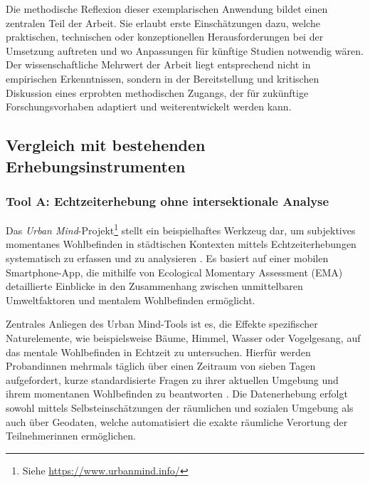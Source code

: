 Die methodische Reflexion dieser exemplarischen Anwendung bildet einen zentralen Teil der Arbeit. Sie erlaubt erste Einschätzungen dazu, welche praktischen, technischen oder konzeptionellen Herausforderungen bei der Umsetzung auftreten und wo Anpassungen für künftige Studien notwendig wären. Der wissenschaftliche Mehrwert der Arbeit liegt entsprechend nicht in empirischen Erkenntnissen, sondern in der Bereitstellung und kritischen Diskussion eines erprobten methodischen Zugangs, der für zukünftige Forschungsvorhaben adaptiert und weiterentwickelt werden kann.


\subsection{Vergleich mit bestehenden Erhebungsinstrumenten}

\subsubsection{Tool A: Echtzeiterhebung ohne intersektionale Analyse}

Das \textit{Urban Mind}-Projekt\footnote{Siehe \url{https://www.urbanmind.info/}} stellt ein beispielhaftes Werkzeug dar, um subjektives momentanes Wohlbefinden in städtischen Kontexten mittels Echtzeiterhebungen systematisch zu erfassen und zu analysieren \parencite{bakolisUrbanMindUsing2018}. Es basiert auf einer mobilen Smartphone-App, die mithilfe von Ecological Momentary Assessment (EMA) detaillierte Einblicke in den Zusammenhang zwischen unmittelbaren Umweltfaktoren und mentalem Wohlbefinden ermöglicht.

Zentrales Anliegen des Urban Mind-Tools ist es, die Effekte spezifischer Naturelemente, wie beispielsweise Bäume, Himmel, Wasser oder Vogelgesang, auf das mentale Wohlbefinden in Echtzeit zu untersuchen. Hierfür werden Proband\:innen mehrmals täglich über einen Zeitraum von sieben Tagen aufgefordert, kurze standardisierte Fragen zu ihrer aktuellen Umgebung und ihrem momentanen Wohlbefinden zu beantworten \parencite{bakolisUrbanMindUsing2018}. Die Datenerhebung erfolgt sowohl mittels Selbsteinschätzungen der räumlichen und sozialen Umgebung als auch über Geodaten, welche automatisiert die exakte räumliche Verortung der Teilnehmer\:innen ermöglichen.

